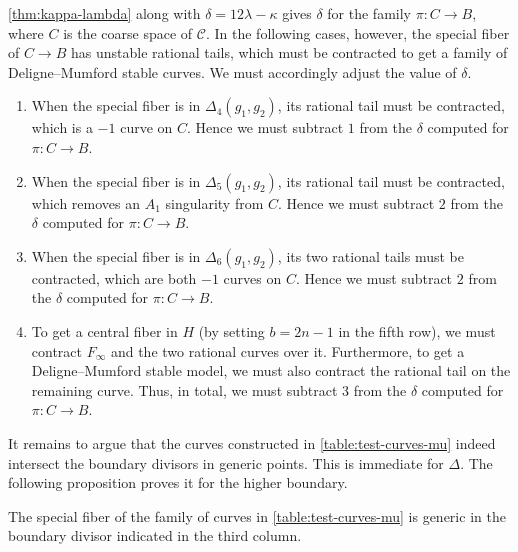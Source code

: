 \documentclass{amsart}
\newcommand {\from}{{\colon}}
\newcommand{\orb}[1]{{\mathcal #1}}     %
\begin{document}
\begin{remark}\label{rem:even_adjustments}
  \autoref{thm:kappa-lambda} along with $\delta = 12\lambda - \kappa$ gives $\delta$ for the family $\pi \from C \to B$, where $C$ is the coarse space of $\orb C$. In the following cases, however, the special fiber of $C \to B$ has unstable rational tails, which must be contracted to get a family of Deligne--Mumford stable curves. We must accordingly adjust the value of $\delta$.
\begin{enumerate}
\item When the special fiber is in $\Delta_4(g_1, g_2)$, its rational tail must be contracted, which is a $-1$ curve on $C$. Hence we must subtract $1$ from the $\delta$ computed for $\pi \from C \to B$.
\item When the special fiber is in $\Delta_5(g_1, g_2)$, its rational tail must be contracted, which removes an $A_1$ singularity from $C$. Hence we must subtract $2$ from the $\delta$ computed for $\pi \from C \to B$.
\item When the special fiber is in $\Delta_6(g_1, g_2)$, its two rational tails must be contracted, which are both $-1$ curves on $C$. Hence we must subtract $2$ from the $\delta$ computed for $\pi \from C \to B$.
\item To get a central fiber in $H$ (by setting $b = 2n-1$ in the fifth row), we must contract $F_\infty$ and the two rational curves over it. Furthermore, to get a Deligne--Mumford stable model, we must also contract the rational tail on the remaining curve. Thus, in total, we must subtract 3 from the $\delta$ computed for $\pi \from C \to B$.
\end{enumerate}
\end{remark}
It remains to argue that the curves constructed in \autoref{table:test-curves-mu} indeed intersect the boundary divisors in generic points. This is immediate for $\Delta$. The following proposition proves it for the higher boundary.
\begin{proposition}\label{thm:generic_boundary}
  The special fiber of the family of curves in \autoref{table:test-curves-mu} is generic in the boundary divisor indicated in the third column.
\end{proposition}
\end{document}
